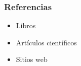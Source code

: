 \begin{frame}\transblindsvertical
	\frametitle{Referencias}

	\begin{itemize}
		\item Libros

		      \nocite{*}
		      \printbibliography[heading=none,keyword=book]
	\end{itemize}

	\begin{itemize}
		\item Artículos científicos

		      \printbibliography[heading=none,keyword=paper]
	\end{itemize}

	\begin{itemize}

		\item Sitios web

		      \printbibliography[heading=none,keyword=online]
	\end{itemize}
\end{frame}